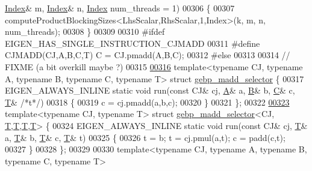 \begin{DoxyCode}
      \hyperlink{namespace_eigen_a62e77e0933482dafde8fe197d9a2cfde}{Index}& m, \hyperlink{namespace_eigen_a62e77e0933482dafde8fe197d9a2cfde}{Index}& n, \hyperlink{namespace_eigen_a62e77e0933482dafde8fe197d9a2cfde}{Index} num\_threads = 1)
00306 \{
00307   computeProductBlockingSizes<LhsScalar,RhsScalar,1,Index>(k, m, n, num\_threads);
00308 \}
00309 
00310 \textcolor{preprocessor}{#ifdef EIGEN\_HAS\_SINGLE\_INSTRUCTION\_CJMADD}
00311 \textcolor{preprocessor}{  #define CJMADD(CJ,A,B,C,T)  C = CJ.pmadd(A,B,C);}
00312 \textcolor{preprocessor}{#else}
00313 
00314   \textcolor{comment}{// FIXME (a bit overkill maybe ?)}
00315 
\hyperlink{struct_eigen_1_1internal_1_1gebp__madd__selector}{00316}   \textcolor{keyword}{template}<\textcolor{keyword}{typename} CJ, \textcolor{keyword}{typename} A, \textcolor{keyword}{typename} B, \textcolor{keyword}{typename} C, \textcolor{keyword}{typename} T> \textcolor{keyword}{struct }
      \hyperlink{struct_eigen_1_1internal_1_1gebp__madd__selector}{gebp\_madd\_selector} \{
00317     EIGEN\_ALWAYS\_INLINE \textcolor{keyword}{static} \textcolor{keywordtype}{void} run(\textcolor{keyword}{const} CJ& cj, \hyperlink{group___core___module_class_eigen_1_1_matrix}{A}& a, \hyperlink{group___core___module_class_eigen_1_1_matrix}{B}& b, \hyperlink{group___core___module}{C}& c, \hyperlink{group___sparse_core___module}{T}& \textcolor{comment}{/*t*/})
00318     \{
00319       c = cj.pmadd(a,b,c);
00320     \}
00321   \};
00322 
\hyperlink{struct_eigen_1_1internal_1_1gebp__madd__selector_3_01_c_j_00_01_t_00_01_t_00_01_t_00_01_t_01_4}{00323}   \textcolor{keyword}{template}<\textcolor{keyword}{typename} CJ, \textcolor{keyword}{typename} T> \textcolor{keyword}{struct }\hyperlink{struct_eigen_1_1internal_1_1gebp__madd__selector}{gebp\_madd\_selector}<CJ,
      \hyperlink{group___sparse_core___module}{T},\hyperlink{group___sparse_core___module}{T},\hyperlink{group___sparse_core___module}{T},\hyperlink{group___sparse_core___module}{T}> \{
00324     EIGEN\_ALWAYS\_INLINE \textcolor{keyword}{static} \textcolor{keywordtype}{void} run(\textcolor{keyword}{const} CJ& cj, \hyperlink{group___sparse_core___module}{T}& a, \hyperlink{group___sparse_core___module}{T}& b, \hyperlink{group___sparse_core___module}{T}& c, \hyperlink{group___sparse_core___module}{T}& t)
00325     \{
00326       t = b; t = cj.pmul(a,t); c = padd(c,t);
00327     \}
00328   \};
00329 
00330   \textcolor{keyword}{template}<\textcolor{keyword}{typename} CJ, \textcolor{keyword}{typename} A, \textcolor{keyword}{typename} B, \textcolor{keyword}{typename} C, \textcolor{keyword}{typename} T>

\end{DoxyCode}
